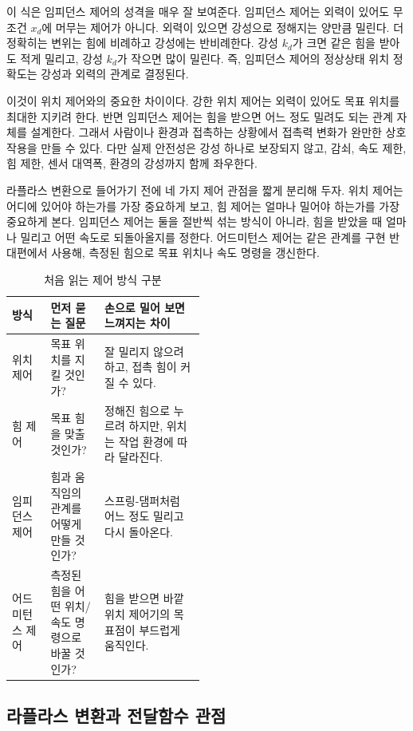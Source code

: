 이 식은 임피던스 제어의 성격을 매우 잘 보여준다.
임피던스 제어는 외력이 있어도 무조건 $x_d$에 머무는 제어가 아니다.
외력이 있으면 강성으로 정해지는 양만큼 밀린다.
더 정확히는 변위는 힘에 비례하고 강성에는 반비례한다.
강성 $k_d$가 크면 같은 힘을 받아도 적게 밀리고, 강성 $k_d$가 작으면 많이 밀린다.
즉, 임피던스 제어의 정상상태 위치 정확도는 강성과 외력의 관계로 결정된다.

이것이 위치 제어와의 중요한 차이이다.
강한 위치 제어는 외력이 있어도 목표 위치를 최대한 지키려 한다.
반면 임피던스 제어는 힘을 받으면 어느 정도 밀려도 되는 관계 자체를 설계한다.
그래서 사람이나 환경과 접촉하는 상황에서 접촉력 변화가 완만한 상호작용을 만들 수 있다.
다만 실제 안전성은 강성 하나로 보장되지 않고, 감쇠, 속도 제한, 힘 제한, 센서 대역폭, 환경의 강성까지 함께 좌우한다.

라플라스 변환으로 들어가기 전에 네 가지 제어 관점을 짧게 분리해 두자.
위치 제어는 어디에 있어야 하는가를 가장 중요하게 보고, 힘 제어는 얼마나 밀어야 하는가를 가장 중요하게 본다.
임피던스 제어는 둘을 절반씩 섞는 방식이 아니라, 힘을 받았을 때 얼마나 밀리고 어떤 속도로 되돌아올지를 정한다.
어드미턴스 제어는 같은 관계를 구현 반대편에서 사용해, 측정된 힘으로 목표 위치나 속도 명령을 갱신한다.

\begin{table}[!htbp]
  \centering
  \caption{처음 읽는 제어 방식 구분}
  \small
  \begin{tabularx}{\linewidth}{@{}>{\raggedright\arraybackslash}p{0.20\linewidth}>{\raggedright\arraybackslash}p{0.28\linewidth}>{\raggedright\arraybackslash}X@{}}
    \toprule
    방식 & 먼저 묻는 질문 & 손으로 밀어 보면 느껴지는 차이 \\
    \midrule
    위치 제어 & 목표 위치를 지킬 것인가? & 잘 밀리지 않으려 하고, 접촉 힘이 커질 수 있다. \\
    힘 제어 & 목표 힘을 맞출 것인가? & 정해진 힘으로 누르려 하지만, 위치는 작업 환경에 따라 달라진다. \\
    임피던스 제어 & 힘과 움직임의 관계를 어떻게 만들 것인가? & 스프링-댐퍼처럼 어느 정도 밀리고 다시 돌아온다. \\
    어드미턴스 제어 & 측정된 힘을 어떤 위치/속도 명령으로 바꿀 것인가? & 힘을 받으면 바깥 위치 제어기의 목표점이 부드럽게 움직인다. \\
    \bottomrule
  \end{tabularx}
\end{table}

\subsection{라플라스 변환과 전달함수 관점}


